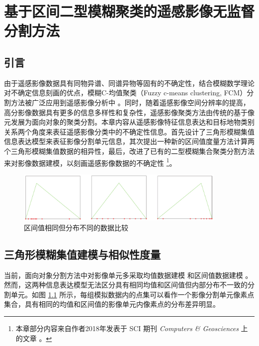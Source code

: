 
\chapter{基于区间二型模糊聚类的遥感影像无监督分割方法}
\label{cha:chap03}

\section{引言}
\label{sec:chap03-1}
由于遥感影像数据具有同物异谱、同谱异物等固有的不确定性，结合模糊数学理论对不确定信息刻画的优点，模糊C-均值聚类（Fuzzy c-means clustering, FCM）分割方法被广泛应用到遥感影像分析中 \cite{bezdek1984fcm}。同时，随着遥感影像空间分辨率的提高，高分影像数据具有更多的信息多样性和复杂性，遥感影像聚类方法由传统的基于像元发展为面向对象的聚类分割。本章内容从遥感影像特征信息表达和目标地物类别关系两个角度来表征遥感影像分类中的不确定性信息。首先设计了三角形模糊集值信息表达模型来表征影像分割单元信息，其次提出一种新的区间值度量方法计算两个三角形模糊集值数据的相异性，最后，改进了已有的二型模糊集合聚类分割方法来对影像数据建模，以刻画遥感影像数据的不确定性  \footnote{本章部分内容来自作者2018年发表于 SCI 期刊 \textit{Computers \& Geosciences} 上的文章 \cite{jiang2018enhanced}。 }。

\begin{figure}[htbp]
    \centering
    \includegraphics[width=0.9\textwidth]{figures/compare_distribution}
    \caption{区间值相同但分布不同的数据比较}
    \label{fig:compare_distribution}
\end{figure}

\section{三角形模糊集值建模与相似性度量}
\label{sec:chap03-2}
当前，面向对象分割方法中对影像单元多采取均值数据建模 \cite{yu2012method} 和区间值数据建模 \cite{he2016remote} 。然而，这两种信息表达模型无法区分具有相同均值和区间值但内部分布不一致的分割单元。如图 \ref{fig:compare_distribution} 所示，每组模拟数据内的点集可以看作一个影像分割单元像素点集合，具有相同的均值和区间值的影像单元内像素点的分布差异明显。

